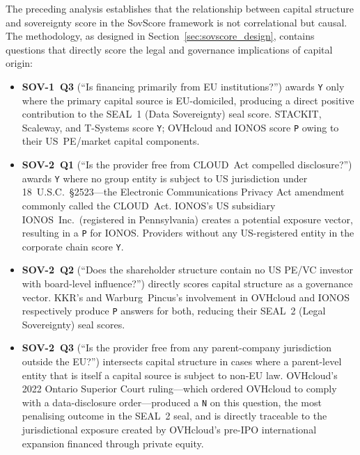 The preceding analysis establishes that the relationship between capital structure and sovereignty score in the SovScore framework is not correlational but causal. The methodology, as designed in Section~\ref{sec:sovscore_design}, contains questions that directly score the legal and governance implications of capital origin:

\begin{itemize}
  \item \textbf{SOV-1~Q3} (``Is financing primarily from EU institutions?'') awards \texttt{Y} only where the primary capital source is EU-domiciled, producing a direct positive contribution to the SEAL~1 (Data Sovereignty) seal score. STACKIT, Scaleway, and T-Systems score \texttt{Y}; OVHcloud and IONOS score \texttt{P} owing to their US~PE/market capital components.
  \item \textbf{SOV-2~Q1} (``Is the provider free from CLOUD~Act compelled disclosure?'') awards \texttt{Y} where no group entity is subject to US jurisdiction under 18~U.S.C.\ §2523---the Electronic Communications Privacy Act amendment commonly called the CLOUD~Act. IONOS's US subsidiary IONOS~Inc.\ (registered in Pennsylvania) creates a potential exposure vector, resulting in a \texttt{P} for IONOS. Providers without any US-registered entity in the corporate chain score \texttt{Y}.
  \item \textbf{SOV-2~Q2} (``Does the shareholder structure contain no US PE/VC investor with board-level influence?'') directly scores capital structure as a governance vector. KKR's and Warburg~Pincus's involvement in OVHcloud and IONOS respectively produce \texttt{P} answers for both, reducing their SEAL~2 (Legal Sovereignty) seal scores.
  \item \textbf{SOV-2~Q3} (``Is the provider free from any parent-company jurisdiction outside the EU?'') intersects capital structure in cases where a parent-level entity that is itself a capital source is subject to non-EU law. OVHcloud's 2022 Ontario Superior Court ruling---which ordered OVHcloud to comply with a data-disclosure order---produced a \texttt{N} on this question, the most penalising outcome in the SEAL~2 seal, and is directly traceable to the jurisdictional exposure created by OVHcloud's pre-IPO international expansion financed through private equity.
\end{itemize}

